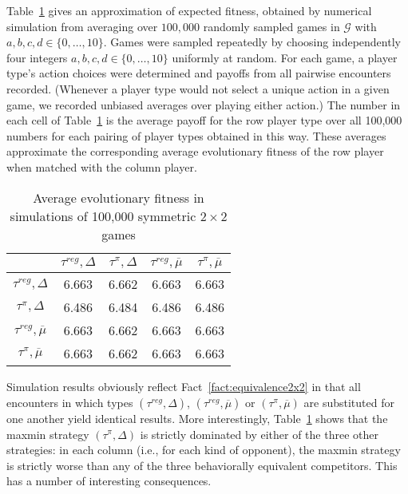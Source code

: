 \documentclass[fleqn,reqno,11pt]{article}
\begin{document}
Table~\ref{tab:ExpectedFitness_4Types} gives an approximation of expected fitness, obtained by
numerical simulation from averaging over $100,000$ randomly sampled games in $\mathcal{G}$ with
$a,b,c,d \in \lbrace 0, \dots, 10 \rbrace$. Games were sampled repeatedly by
choosing independently four integers $a,b,c,d \in \lbrace 0, \dots, 10 \rbrace$ uniformly at
random. For each game, a player type's action choices were determined and payoffs from all
pairwise encounters recorded. (Whenever a player type would not select a unique action in a
given game, we recorded unbiased averages over playing either action.) The number in each cell
of Table~\ref{tab:ExpectedFitness_4Types} is the average payoff for the row player type over
all 100,000 numbers for each pairing of player types obtained in this way. These averages
approximate the corresponding average evolutionary fitness of the row player when matched with
the column player.

\begin{table}[t]
\centering
\begin{tabular}{ccccc}
  \toprule
 & $\tau^{reg}, \Delta$ 
 & $\tau^{\pi}, \Delta$ 
 & $\tau^{reg}, \overline{\mu}$ 
 & $\tau^{\pi}, \overline{\mu}$ \\ 
  \midrule
  $\tau^{reg}, \Delta$ & 6.663 & 6.662 & 6.663 & 6.663 \\ 
  $\tau^{\pi}, \Delta$ & 6.486 & 6.484 & 6.486 & 6.486 \\ 
  $\tau^{reg}, \overline{\mu}$ & 6.663 & 6.662 & 6.663 & 6.663 \\  
  $\tau^{\pi}, \overline{\mu}$ & 6.663 & 6.662 & 6.663 & 6.663 \\ 
   \bottomrule
\end{tabular}                    
\caption{Average evolutionary fitness in simulations of 100,000 symmetric $2 \times 2$ games}
\label{tab:ExpectedFitness_4Types}
\end{table}

Simulation results obviously reflect Fact~\ref{fact:equivalence2x2} in that all encounters in
which types $(\tau^{reg}, \Delta)$, $(\tau^{reg}, \overline{\mu})$ or
$(\tau^{\pi}, \overline{\mu})$ are substituted for one another yield identical results. More
interestingly, Table~\ref{tab:ExpectedFitness_4Types} shows that the maxmin strategy
$(\tau^{\pi}, \Delta)$ is strictly dominated by either of the three other strategies:
in each column (i.e., for each kind of opponent), the maxmin strategy is strictly worse
than any of the three behaviorally equivalent competitors. This has a number of interesting
consequences.
\end{document}
